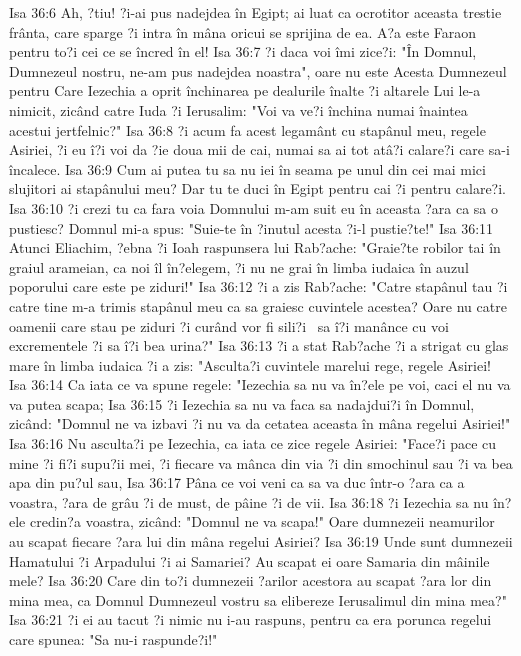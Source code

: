 Isa 36:6  Ah, ?tiu! ?i-ai pus nadejdea în Egipt; ai luat ca ocrotitor aceasta trestie frânta, care sparge ?i intra în mâna oricui se sprijina de ea. A?a este Faraon pentru to?i cei ce se încred în el!
Isa 36:7  ?i daca voi îmi zice?i: "În Domnul, Dumnezeul nostru, ne-am pus nadejdea noastra", oare nu este Acesta Dumnezeul pentru Care Iezechia a oprit închinarea pe dealurile înalte ?i altarele Lui le-a nimicit, zicând catre Iuda ?i Ierusalim: "Voi va ve?i închina numai înaintea acestui jertfelnic?"
Isa 36:8  ?i acum fa acest legamânt cu stapânul meu, regele Asiriei, ?i eu î?i voi da ?ie doua mii de cai, numai sa ai tot atâ?i calare?i care sa-i încalece.
Isa 36:9  Cum ai putea tu sa nu iei în seama pe unul din cei mai mici slujitori ai stapânului meu? Dar tu te duci în Egipt pentru cai ?i pentru calare?i.
Isa 36:10  ?i crezi tu ca fara voia Domnului m-am suit eu în aceasta ?ara ca sa o pustiesc? Domnul mi-a spus: "Suie-te în ?inutul acesta ?i-l pustie?te!"
Isa 36:11  Atunci Eliachim, ?ebna ?i Ioah raspunsera lui Rab?ache: "Graie?te robilor tai în graiul arameian, ca noi îl în?elegem, ?i nu ne grai în limba iudaica în auzul poporului care este pe ziduri!"
Isa 36:12  ?i a zis Rab?ache: "Catre stapânul tau ?i catre tine m-a trimis stapânul meu ca sa graiesc cuvintele acestea? Oare nu catre oamenii care stau pe ziduri ?i curând vor fi sili?i  sa î?i manânce cu voi excrementele ?i sa î?i bea urina?"
Isa 36:13  ?i a stat Rab?ache ?i a strigat cu glas mare în limba iudaica ?i a zis: "Asculta?i cuvintele marelui rege, regele Asiriei!
Isa 36:14  Ca iata ce va spune regele: "Iezechia sa nu va în?ele pe voi, caci el nu va va putea scapa;
Isa 36:15  ?i Iezechia sa nu va faca sa nadajdui?i în Domnul, zicând: "Domnul ne va izbavi ?i nu va da cetatea aceasta în mâna regelui Asiriei!"
Isa 36:16  Nu asculta?i pe Iezechia, ca iata ce zice regele Asiriei: "Face?i pace cu mine ?i fi?i supu?ii mei, ?i fiecare va mânca din via ?i din smochinul sau ?i va bea apa din pu?ul sau,
Isa 36:17  Pâna ce voi veni ca sa va duc într-o ?ara ca a voastra, ?ara de grâu ?i de must, de pâine ?i de vii.
Isa 36:18  ?i Iezechia sa nu în?ele credin?a voastra, zicând: "Domnul ne va scapa!" Oare dumnezeii neamurilor au scapat fiecare ?ara lui din mâna regelui Asiriei?
Isa 36:19  Unde sunt dumnezeii Hamatului ?i Arpadului ?i ai Samariei? Au scapat ei oare Samaria din mâinile mele?
Isa 36:20  Care din to?i dumnezeii ?arilor acestora au scapat ?ara lor din mina mea, ca Domnul Dumnezeul vostru sa elibereze Ierusalimul din mina mea?"
Isa 36:21  ?i ei au tacut ?i nimic nu i-au raspuns, pentru ca era porunca regelui care spunea: "Sa nu-i raspunde?i!"
